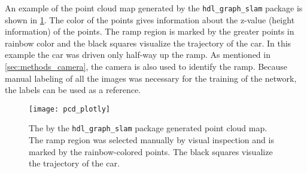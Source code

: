 An example of the point cloud map generated by the \texttt{hdl\_graph\_slam} package is shown in \cref{fig:pcd_plotly}.
The color of the points gives information about the z-value (height information) of the points.
The ramp region is marked by the greater points in rainbow color and the black squares visualize the trajectory of the car.
In this example the car was driven only half-way up the ramp.
As mentioned in \cref{sec:methods_camera}, the camera is also used to identify the ramp.
Because manual labeling of all the images was necessary for the training of the network, the labels can be used as a reference.
\begin{figure}[htb]
	\centering
	\texttt{[image: pcd\_plotly]}
	\caption[Generated point cloud map]{The by the \texttt{hdl\_graph\_slam} package generated point cloud map. The ramp region was selected manually by visual inspection and is marked by the rainbow-colored points. The black squares visualize the trajectory of the car.}
	\label{fig:pcd_plotly}
\end{figure}



